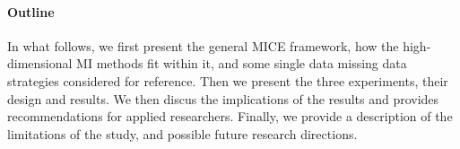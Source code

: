 \paragraph{Outline}
In what follows, we first present the general MICE framework, how the high-dimensional MI methods fit within it, and some
single data missing data strategies considered for reference.
Then we present the three experiments, their design and results.
We then discus the implications of the results and provides recommendations for applied researchers.
Finally, we provide a description of the limitations of the study, and possible future research directions.
